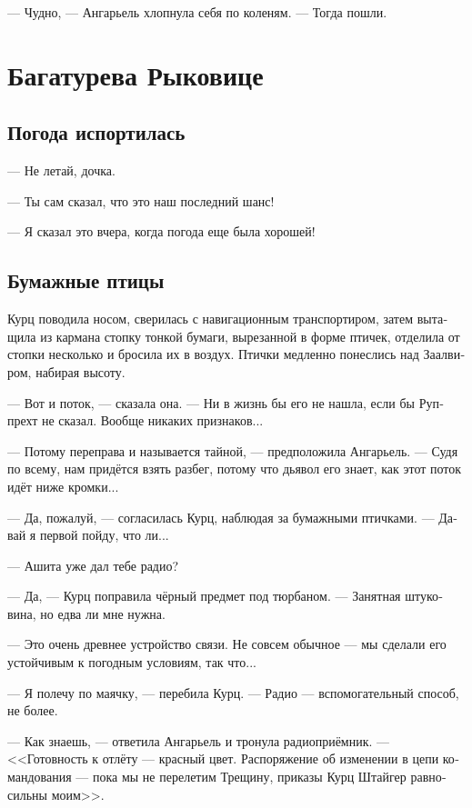 \documentclass[a4paper,12pt,fleqn]{book}\usepackage{cooltooltips}\usepackage{polyglossia}\setdefaultlanguage[babelshorthands=true]{russian}\setotherlanguage{english}\defaultfontfeatures{Ligatures=TeX,Mapping=tex-text} \usepackage{xcolor}\definecolor{lightgray}{HTML}{bbbbbb}\color{lightgray}\newcommand{\ml}[3]{\textenglish{\textcolor{black}{#3}}}
\begin{document}
--- Чудно, --- Ангарьель хлопнула себя по коленям.
--- Тогда пошли.

\chapter{Багатурева Рыковице}


\section{Погода испортилась}

--- Не летай, дочка.

--- Ты сам сказал, что это наш последний шанс!

--- Я сказал это вчера, когда погода еще была хорошей!

\section{Бумажные птицы}

Курц поводила носом, сверилась с навигационным транспортиром, затем вытащила из кармана стопку тонкой бумаги, вырезанной в форме птичек, отделила от стопки несколько и бросила их в воздух.
Птички медленно понеслись над Заалвиром, набирая высоту.

--- Вот и поток, --- сказала она.
--- Ни в жизнь бы его не нашла, если бы Руппрехт не сказал.
Вообще никаких признаков...

--- Потому переправа и называется тайной, --- предположила Ангарьель.
--- Судя по всему, нам придётся взять разбег, потому что дьявол его знает, как этот поток идёт ниже кромки...

--- Да, пожалуй, --- согласилась Курц, наблюдая за бумажными птичками.
--- Давай я первой пойду, что ли...

--- Ашита уже дал тебе радио?

--- Да, --- Курц поправила чёрный предмет под тюрбаном.
--- Занятная штуковина, но едва ли мне нужна.

--- Это очень древнее устройство связи.
Не совсем обычное --- мы сделали его устойчивым к погодным условиям, так что...

--- Я полечу по маячку, --- перебила Курц.
--- Радио --- вспомогательный способ, не более.

--- Как знаешь, --- ответила Ангарьель и тронула радиоприёмник.
--- <<Готовность к отлёту --- красный цвет.
Распоряжение об изменении в цепи командования --- пока мы не перелетим Трещину, приказы Курц Штайгер равносильны моим>>.
\end{document}
